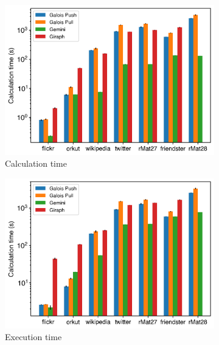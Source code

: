 \begin{figure}
	\begin{subfigure}{0.32\textwidth}
		\includegraphics[width=\linewidth]{../../plots/distributedPR_calcTime.png}
		\caption{Calculation time}
		\label{fig:distributedPR_calc}
	\end{subfigure}
	\hfil
	\begin{subfigure}{0.32\textwidth}
		\includegraphics[width=\linewidth]{../../plots/distributedPR_execTime.png}
		\caption{Execution time}
		\label{fig:distributedPR_exec}
	\end{subfigure}
	\hfil
	\begin{subfigure}{0.32\textwidth}

\end{subfigure}
\end{figure}
